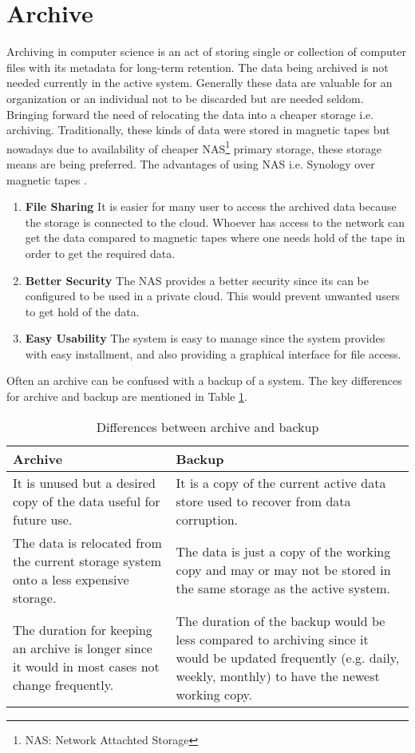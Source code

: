 \section{Archive}

Archiving in computer science is an act of storing single or collection of computer files with its metadata for long-term retention. The data being archived is 
not needed currently in the active system. Generally these data are valuable for an organization or an individual not to be discarded but are needed seldom. 
Bringing forward the need of relocating the data into a cheaper storage i.e. archiving. Traditionally, these kinds of data were stored in magnetic tapes but nowadays 
due to availability of cheaper NAS\footnote{NAS: Network Attachted Storage} primary storage, 
these storage means are being preferred. 
The advantages of using NAS i.e. Synology over magnetic tapes \cite{Synology}.
\begin{enumerate}
    \item \textbf{File Sharing} It is easier for many user to access the archived data because the storage is connected to the cloud. Whoever has access to the
    network can get the data compared to magnetic tapes where one needs hold of the tape in order to get the required data.
    \item \textbf{Better Security} The NAS provides a better security since its can be configured to be used in a private cloud. This would prevent unwanted users
    to get hold of the data.
    \item \textbf{Easy Usability} The system is easy to manage since the system provides with easy installment, and also providing a graphical interface for file access.
\end{enumerate}
Often an archive can be confused
with a backup of a system. The key differences for archive and backup are mentioned in Table \ref{table:archiveVsBackup}.

\begin{table}[H]
    \centering
    \begin{tabular}{|p{8cm}|p{8cm}|}
        \hline
            \textbf{Archive}  & \textbf{Backup}\\
        \hline
            It is unused but a desired copy of the data useful for future use.& 
            It is a copy of the current active data store used to recover from data corruption. \\
        \hline
            The data is relocated from the current storage system onto a less expensive storage.
            & The data is just a copy of the working copy and may or may not be stored in the same storage as the active system.\\
        \hline
             The duration for keeping an archive is longer since it would in most cases not change frequently.
             & The duration of the backup would be less compared to archiving since it would be updated frequently (e.g. daily, weekly, monthly) to have the newest 
             working copy.\\
        \hline
    \end{tabular}
    \caption{Differences between archive and backup}
    \label{table:archiveVsBackup}     
\end{table}    
